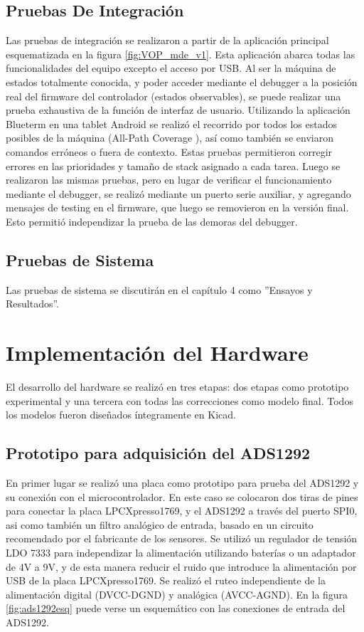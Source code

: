 \subsection{Pruebas De Integración} \label{pruebasIntegracion}

Las pruebas de integración se realizaron a partir de la aplicación principal esquematizada en la figura \ref{fig:VOP_mde_v1}. Esta aplicación abarca todas las funcionalidades del equipo excepto el acceso por USB. Al ser la máquina de estados totalmente conocida, y poder acceder mediante el debugger a la posición real del firmware del controlador (estados observables), se puede realizar una prueba exhaustiva de la función de interfaz de usuario. 
Utilizando la aplicación Blueterm en una tablet Android se realizó el recorrido por todos los estados posibles de la máquina (All-Path Coverage \citep{lin2013}), así como también se enviaron comandos erróneos o fuera de contexto. Estas pruebas permitieron corregir errores en las prioridades y tamaño de stack asignado a cada tarea.
Luego se realizaron las mismas pruebas, pero en lugar de verificar el funcionamiento mediante el debugger, se realizó mediante un puerto serie auxiliar, y agregando mensajes de testing en el firmware, que luego se removieron en la versión final. Esto permitió independizar la prueba de las demoras del debugger.


\subsection{Pruebas de Sistema} \label{pruebasSistema}

Las pruebas de sistema se discutirán en el capítulo 4 como ''Ensayos y Resultados''.

\section{Implementación del Hardware} \label{implementacionHw}

El desarrollo del hardware se realizó en tres etapas: dos etapas como prototipo experimental y una tercera con todas las correcciones como modelo final. Todos los modelos fueron diseñados íntegramente en Kicad.

\subsection{Prototipo para adquisición del ADS1292}

En primer lugar se realizó una placa como prototipo para prueba del ADS1292 y su conexión con el microcontrolador. En este caso se colocaron dos tiras de pines para conectar la placa LPCXpresso1769, y el ADS1292 a través del puerto SPI0, asi como también un filtro analógico de entrada, basado en un circuito recomendado por el fabricante de los sensores. Se utilizó un regulador de tensión LDO 7333 para independizar la alimentación utilizando baterías o un adaptador de 4V a 9V, y de esta manera reducir el ruido que introduce la alimentación por USB de la placa LPCXpresso1769. 
Se realizó el ruteo independiente de la alimentación digital (DVCC-DGND) y analógica (AVCC-AGND). En la figura \ref{fig:ads1292esq} puede verse un esquemático con las conexiones de entrada del ADS1292.

